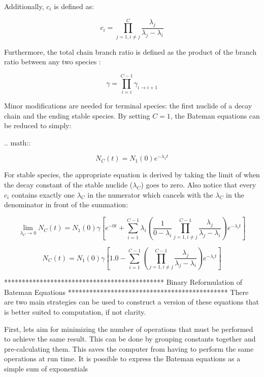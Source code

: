 \documentclass{anstrans}
\begin{document}
Additionally, $c_{i}$ is defined as:

\begin{equation}
\label{c_i}
c_i = \prod_{j=1,i\ne j}^C \frac{\lambda_j}{\lambda_j - \lambda_i}
\end{equation}

Furthermore, the total chain branch ratio is defined as the product of the 
branch ratio between any two species \cite{harr2007precise}:

\begin{equation}
\label{gamma}
\gamma = \prod_{i=i}^{C-1} \gamma_{i \to i+1}
\end{equation}

Minor modifications are needed for terminal species: the first nuclide of a 
decay chain and the ending stable species. By setting $C=1$, the Bateman
equations can be reduced to simply:

.. math:: 

\begin{equation}
\label{N_C}
N_C(t) = N_1(0) e^{-\lambda_1 t}
\end{equation}

For stable species, the appropriate equation is derived by taking the limit
of when the decay constant of the stable nuclide ($\lambda_C$) goes to 
zero.  Also notice that every $c_i$ contains exactly one $\lambda_C$
in the numerator which cancels with the $\lambda_C$ in the denominator 
in front of the summation:

\begin{equation}
\label{lim_lam}
\lim_{\lambda_C \to 0} N_C(t) = N_1(0)  \gamma \left[e^{-0t} + \sum_{i=1}^{C-1} \lambda_i \left(\frac{1}{0 - \lambda_i} \prod_{j=1,i\ne j}^{C-1} \frac{\lambda_j}{\lambda_j - \lambda_i} \right) e^{-\lambda_i t} \right]
\end{equation}

\begin{equation}
\label{lim_lam_N_C}
N_C(t) = N_1(0)  \gamma \left[1.0 - \sum_{i=1}^{C-1} \left(\prod_{j=1,i\ne j}^{C-1} \frac{\lambda_j}{\lambda_j - \lambda_i} \right) e^{-\lambda_i t} \right]
\end{equation}


*********************************************
Binary Reformulation of Bateman Equations
*********************************************
There are two main strategies can be used to construct a version of these equations that 
is better suited to computation, if not clarity. 

First, lets aim for minimizing the number of 
operations that must be performed to achieve the same result. This can be done 
by grouping constants together and pre-calculating them. This saves the computer from 
having to perform the same operations at run time.  It is possible to express the 
Bateman equations as a simple sum of exponentials
\end{document}
